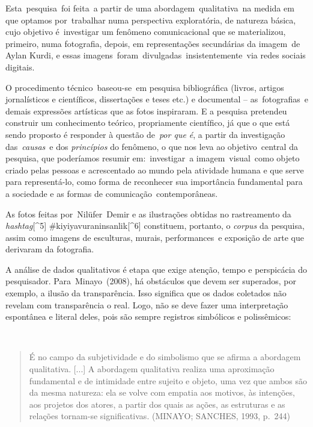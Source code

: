 \documentclass[
  letterpaper,
]{abntex2}
\begin{document}
Esta~pesquisa~foi feita~a partir de uma abordagem~qualitativa~na medida
em que optamos por~trabalhar numa perspectiva exploratória, de natureza
básica, cujo objetivo é~investigar um fenômeno comunicacional que se
materializou, primeiro, numa fotografia, depois, em representações
secundárias da imagem~de Aylan Kurdi, e essas
imagens~foram~divulgadas~insistentemente~via redes sociais digitais.

O procedimento técnico~baseou-se~em pesquisa bibliográfica (livros,
artigos jornalísticos e científicos, dissertações e teses etc.) e
documental -- as~fotografias~e demais expressões artísticas que as fotos
inspiraram. E a pesquisa pretendeu construir um conhecimento teórico,
propriamente científico, já que o que está sendo proposto é responder à
questão de~\emph{por que é}, a partir da investigação
das~\emph{causas}~e dos \emph{princípios} do fenômeno, o que nos leva ao
objetivo~central da pesquisa, que poderíamos resumir em:~investigar~a
imagem~visual~como objeto criado pelas pessoas e acrescentado ao mundo
pela atividade humana e que serve para representá-lo, como forma de
reconhecer sua importância fundamental para a sociedade e as formas de
comunicação~contemporâneas.

As fotos feitas por~Nilüfer~Demir e as ilustrações obtidas no
rastreamento da \emph{hashtag}{[}\^{}5{]}
\#kiyiyavuraninsanlik{[}\^{}6{]} constituem, portanto, o \emph{corpus}
da pesquisa, assim como imagens de esculturas, murais, performances~e
exposição de arte que derivaram da fotografia.~

A análise de dados qualitativos é etapa que exige atenção, tempo e
perspicácia do pesquisador. Para~Minayo~(2008), há obstáculos que devem
ser superados, por exemplo, a ilusão da transparência. Isso significa
que os dados coletados não revelam com transparência o real. Logo, não
se deve fazer uma interpretação espontânea e literal deles, pois são
sempre registros simbólicos e polissêmicos:~

~

\begin{quote}
É no campo da subjetividade e do simbolismo que se afirma a abordagem
qualitativa. {[}...{]} A abordagem qualitativa realiza uma aproximação
fundamental e de intimidade entre sujeito e objeto, uma vez que ambos
são da mesma natureza: ela se volve com empatia aos motivos, às
intenções, aos projetos dos atores, a partir dos quais as ações, as
estruturas e as relações tornam-se significativas. (MINAYO; SANCHES,
1993, p.~244)~
\end{quote}
\end{document}
